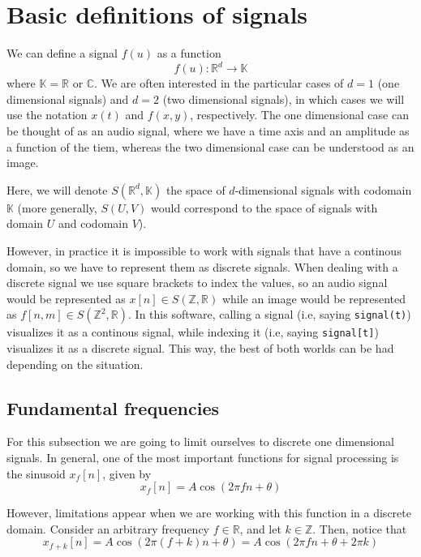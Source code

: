 \documentclass[12pt]{article}
\begin{document}
\section{Basic definitions of signals}
We can define a signal $f(u)$ as a function
\begin{equation}
f(u): \mathbb{R}^d\rightarrow\mathbb{K}
\end{equation}
where $\mathbb{K} = \mathbb{R}$ or $\mathbb{C}$. We are often interested in the particular cases of $d = 1$ (one dimensional signals) and $d = 2$ (two dimensional signals), in which cases we will use the notation $x(t)$ and $f(x, y)$, respectively. The one dimensional case can be thought of as an audio signal, where we have a time axis and an amplitude as a function of the tiem, whereas the two dimensional case can be understood as an image.

Here, we will denote $S\left (\mathbb{R}^d, \mathbb{K}\right )$ the space of $d$-dimensional signals with codomain $\mathbb{K}$ (more generally, $S\left (U, V\right )$ would correspond to the space of signals with domain $U$ and codomain $V$).

However, in practice it is impossible to work with signals that have a continous domain, so we have to represent them as discrete signals. When dealing with a discrete signal we use square brackets to index the values, so an audio signal would be represented as $x[n]\in S\left (\mathbb{Z}, \mathbb{R}\right )$ while an image would be represented as $f[n, m]\in S\left (\mathbb{Z}^2, \mathbb{R}\right )$. In this software, calling a signal (i.e, saying \texttt{signal(t)}) visualizes it as a continous signal, while indexing it (i.e, saying \texttt{signal[t]}) visualizes it as a discrete signal. This way, the best of both worlds can be had depending on the situation.

\subsection{Fundamental frequencies}
For this subsection we are going to limit ourselves to discrete one dimensional signals. In general, one of the most important functions for signal processing is the sinusoid $x_f[n]$, given by
\begin{equation}
x_f[n] = A\cos\left (2\pi fn + \theta\right )
\end{equation}

However, limitations appear when we are working with this function in a discrete domain. Consider an arbitrary frequency $f\in\mathbb{R}$, and let $k\in\mathbb{Z}$. Then, notice that
\begin{equation}
x_{f + k}[n] = A\cos\left (2\pi(f + k)n + \theta\right ) = A\cos\left (2\pi fn + \theta + 2\pi k\right )
\end{equation}
\end{document}
